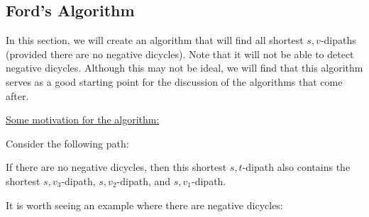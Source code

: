 \subsection{Ford's Algorithm}
In this section, we will create an algorithm that will find all shortest $s,v$-dipaths (provided there are no negative dicycles).
Note that it will not be able to detect negative dicycles.
Although this may not be ideal, we will find that this algorithm serves as a good starting point for the discussion of the algorithms that come after.

\underline{Some motivation for the algorithm:}

Consider the following path:

\begin{minipage}{\textwidth}
    \centering
\end{minipage}

If there are no negative dicycles, then this shortest $s,t$-dipath also contains the shortest $s,v_3$-dipath, $s,v_2$-dipath, and $s,v_1$-dipath.

It is worth seeing an example where there are negative dicycles:

\begin{minipage}{\textwidth}
    \centering
\end{minipage}

